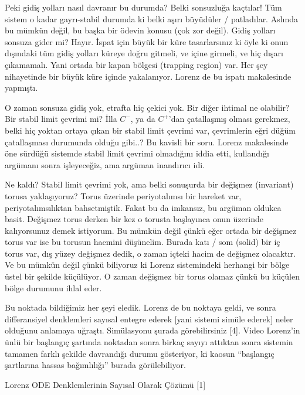 \documentclass[12pt,fleqn]{article}\usepackage{../../common}
\begin{document}
Peki gidiş yolları nasıl davranır bu durumda? Belki sonsuzluğa kaçtılar!
Tüm sistem o kadar gayrı-stabil durumda ki belki aşırı büyüdüler /
patladılar. Aslında bu mümkün değil, bu başka bir ödevin konusu (çok zor
değil). Gidiş yolları sonsuza gider mi? Hayır. İspat için büyük bir küre
tasarlarsınız ki öyle ki onun dışındaki tüm gidiş yolları küreye doğru
gitmeli, ve içine girmeli, ve hiç dışarı çıkamamalı. Yani ortada bir kapan
bölgesi (trapping region) var. Her şey nihayetinde bir büyük küre içinde
yakalanıyor. Lorenz de bu ispatı makalesinde yapmıştı.

O zaman sonsuza gidiş yok, etrafta hiç çekici yok. Bir diğer ihtimal ne
olabilir? Bir stabil limit çevrimi mi? İlla $C^-$, ya da $C^+$'dan
çatallaşmış olması gerekmez, belki hiç yoktan ortaya çıkan bir stabil limit
çevrimi var, çevrimlerin eğri düğüm çatallaşması durumunda olduğu gibi..?
Bu kavisli bir soru. Lorenz makalesinde öne sürdüğü sistemde stabil limit
çevrimi olmadığını iddia etti, kullandığı argümanı sonra işleyeceğiz, ama
argüman inandırıcı idi.

Ne kaldı? Stabil limit çevrimi yok, ama belki sonuşurda bir değişmez
(invariant) torusa yaklaşıyoruz? Torus üzerinde periyotalımsı bir hareket
var, periyotalımsılıktan bahsetmiştik. Fakat bu da imkansız, bu argüman
oldukca basit. Değişmez torus derken bir kez o torusta başlayınca onun
üzerinde kalıyorsunuz demek istiyorum. Bu mümkün değil çünkü eğer ortada
bir değişmez torus var ise bu torusun hacmini düşünelim. Burada katı / som
(solid) bir iç torus var, dış yüzey değişmez dedik, o zaman içteki hacim de
değişmez olacaktır. Ve bu mümkün değil çünkü biliyoruz ki Lorenz
sistemindeki herhangi bir bölge üstel bir şekilde küçülüyor. O zaman
değişmez bir torus olamaz çünkü bu küçülen bölge durumunu ihlal eder.

Bu noktada bildiğimiz her şeyi eledik. Lorenz de bu noktaya geldi, ve sonra
differansiyel denklemleri sayısal entegre ederek [yani sistemi simüle
ederek] neler olduğunu anlamaya uğraştı. Simülasyonu şurada görebilirsiniz
[4]. Video Lorenz'in ünlü bir başlangıç şartında noktadan sonra birkaç
sayıyı attıktan sonra sistemin tamamen farklı şekilde davrandığı durumu
gösteriyor, ki kaosun ``başlangıç şartlarına hassas bağımlılığı'' burada
görülebiliyor. 

Lorenz ODE Denklemlerinin Sayısal Olarak Çözümü [1]
\end{document}
